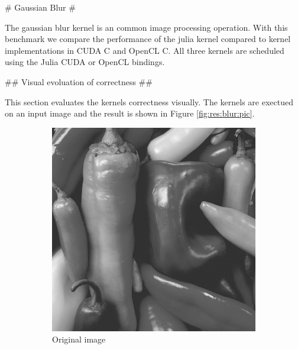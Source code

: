 \begin{markdown}
# Gaussian Blur #

The gaussian blur kernel is an common image processing operation. With
this benchmark we compare the performance of the julia kernel compared
to kernel implementations in CUDA C and OpenCL C. All three kernels are
scheduled using the Julia CUDA or OpenCL bindings. 

## Visual evoluation of correctness ##

This section evaluates the kernels correctness visually. The kernels
are exectued on an input image and the result is shown in Figure
\ref{fig:res:blur:pic}.

\begin{figure}[H]
  \centering
  \begin{subfigure}{.49\textwidth}
    \centering
    \includegraphics[width=1\textwidth]{body/figures/results/blur/input.png}
    \caption{Original image}
    \label{fig:res:blur:pic:input}
  \end{subfigure}%
  \hspace{.01\textwidth}
  \begin{subfigure}{.49\textwidth}
    \centering

\end{subfigure}
\end{figure}
\end{markdown}
